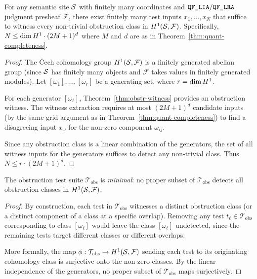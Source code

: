 \documentclass[11pt]{article}
\newcommand{\ObstrSuite}{\mathcal{T}_{\mathrm{obs}}}
\begin{document}
\begin{theorem}\label{thm:finite-witness}
For any semantic site $\mathcal{S}$ with finitely many coordinates and
$\texttt{QF\_LIA}/\texttt{QF\_LRA}$ judgment presheaf $\mathcal{F}$, there exist finitely
many test inputs $x_1, \ldots, x_N$ that suffice to witness every
non-trivial obstruction class in $H^{1}(\mathcal{S}, \mathcal{F})$.
Specifically, $N \leq \dim H^{1} \cdot (2M+1)^d$ where $M$ and
$d$ are as in Theorem~\ref{thm:quant-completeness}.
\end{theorem}

\begin{proof}
The \v{C}ech cohomology group $H^{1}(\mathcal{S}, \mathcal{F})$ is a finitely
generated abelian group (since $\mathcal{S}$ has finitely many objects and
$\mathcal{F}$ takes values in finitely generated modules).  Let
$[\omega_1], \ldots, [\omega_r]$ be a generating set, where
$r = \dim H^{1}$.

For each generator $[\omega_\ell]$, Theorem~\ref{thm:obstr-witness}
provides an obstruction witness.  The witness extraction requires at
most $(2M+1)^d$ candidate inputs (by the same grid argument as in
Theorem~\ref{thm:quant-completeness}) to find a disagreeing input
$x_\omega$ for the non-zero component $\omega_{ij}$.

Since any obstruction class is a linear combination of the generators,
the set of all witness inputs for the generators suffices to detect
any non-trivial class.  Thus $N \leq r \cdot (2M+1)^d$.
\end{proof}

\begin{corollary}\label{cor:minimality}
The obstruction test suite $\ObstrSuite$ is \emph{minimal}: no proper
subset of $\ObstrSuite$ detects all obstruction classes in
$H^{1}(\mathcal{S}, \mathcal{F})$.
\end{corollary}

\begin{proof}
By construction, each test in $\ObstrSuite$ witnesses a distinct
obstruction class (or a distinct component of a class at a specific
overlap).  Removing any test $t_\ell \in \ObstrSuite$ corresponding
to class $[\omega_\ell]$ would leave the class $[\omega_\ell]$
undetected, since the remaining tests target different classes or
different overlaps.

More formally, the map $\phi : \ObstrSuite \to \Hcoh{1}(\Site,
\mathcal{F})$ sending each test to its originating cohomology class is
surjective onto the non-zero classes.  By the linear independence of the
generators, no proper subset of $\ObstrSuite$ maps surjectively.
\end{proof}
\end{document}
